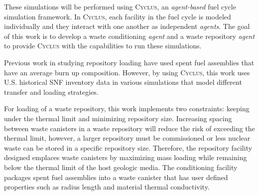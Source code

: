 \documentclass{anstrans}
\begin{document}
    These simulations will be performed using \textsc{Cyclus}, an 
    \textit{agent-based} fuel cycle simulation framework. 
    In \textsc{Cyclus}, each facility in the fuel cycle is modeled individually 
    and they interact with one another as independent \textit{agents}. 
    The goal of this work is to develop a waste conditioning \textit{agent} 
    and a waste repository \textit{agent} to provide \textsc{Cyclus} with 
    the capabilities to run these simulations. 
    
    Previous work in studying repository loading have used spent fuel assemblies 
    that have an average burn up composition. However, by using \textsc{Cyclus}, 
    this work uses U.S. historical SNF inventory data \cite{peterson_unf_standards_2017}
    in various simulations that model different transfer and loading strategies.  
    
    For loading of a waste repository, this work implements two 
    constraints: keeping under the thermal limit and minimizing repository size. 
    Increasing spacing between waste canisters in a waste repository will reduce 
    the risk of exceeding the thermal limit, however, a larger repository must be 
    commissioned or less nuclear waste can be stored in a specific repository size. 
    Therefore, the repository facility designed emplaces waste canisters by 
    maximizing mass loading while remaining below the thermal limit of the 
    host geologic media. The conditioning facility packages spent fuel assemblies 
    into a waste canister that has user defined properties such as radius length 
    and material thermal conductivity. 
    
    
    
    
    
\end{document}
